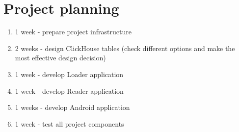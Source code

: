 \documentclass{article}
\begin{document}
\section{Project planning}

\begin{enumerate}
    \item 1 week - prepare project infrastructure
    \item 2 weeks - design ClickHouse tables (check different options and make the most effective design decision)
    \item 1 week - develop Loader application
    \item 1 week - develop Reader application
    \item 1 weeks - develop Android application
    \item 1 week - test all project components
\end{enumerate}
\end{document}
